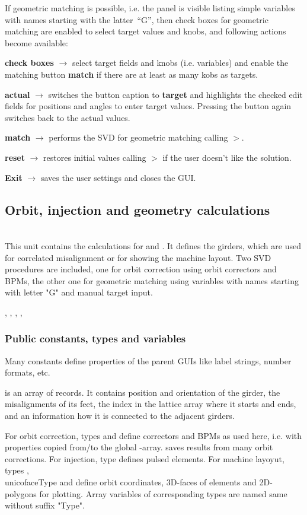 \documentclass[12pt]{article}
\newcommand\code[1]{{\tt #1}}
\newcommand{\ofld}[1]{\colorbox{black!15}{{{\color{black}\bf #1}}}}
\newcommand\guico[1]{{\color{blue}\code{#1}}}
\newcommand{\unico}[1]{{\color{burntorange}\code{#1}}}
\newcommand{\evcod}[2]{\ofld{#1} $\rightarrow$ \guico{#2}}
\newcommand{\prcod}[2]{\opauni{#1}$>$\unico{#2}}
\newcommand{\opagui}[1]{\colorbox{blue!20}{{\color{black}\code{#1}}}}
\newcommand{\ogui}[1]{\hyperref[#1]{\opagui{#1}}}
\newcommand{\opauni}[1]{\colorbox{orange!30}{{\color{black}\code{#1}}}}
\newcommand{\ounih}[2]{\subsection{\label{#2}#1}{\Huge\opauni{#2}}\\}
\newcommand{\ouni}[1]{\hyperref[#1]{\opauni{#1}}}
\newcommand{\uses}[1]{\flushleft {\bf Uses:} #1}
\newcommand{\desc}[1]{#1}
\newcommand{\pvar}[1]{\subsubsection*{Public constants, types and variables} #1}
\begin{document}
If geometric matching is possible, i.e. the panel \guico{PanMat} is visible listing simple variables with names starting with the latter~``G'', then check boxes for geometric matching are enabled to select target values and knobs, and following actions become available:

\evcod{check boxes}{chkg\_Click, chkgvar\_Click} select target fields and knobs (i.e. variables) and enable the matching button \ofld{match} if there are at least as many kobs as targets.

\evcod{actual}{butGoalClick} switches the button caption to \ofld{target} and highlights the checked edit fields for positions and angles to enter target values. Pressing the button again switches back to the actual values.

\evcod{match}{butMatClick} performs the SVD for geometric matching calling \prcod{georblib}{gmat\_ini,gmat\_step}. 

\evcod{reset}{butResetClick} restores initial values calling \prcod{georblib}{gmat\_reset}  if the user doesn't like the solution.

\evcod{Exit}{butExClick} saves the user settings and closes the GUI.





\ounih{Orbit, injection and geometry calculations}{georblib}

\desc{This unit contains the calculations for \ogui{opaorbit} and \ogui{opageometry}. It defines the girders, which are used for correlated misalignment or for showing the machine layout. Two SVD procedures are included, one for orbit correction using orbit correctors and BPMs, the other one for geometric matching using variables with names starting with letter "G" and manual target input.}

\uses{\ouni{globlib}, \ouni{linoplib}, \ouni{elemlib}, \ouni{mathlib}, \ouni{comauxlib}}

\pvar{}

Many constants define properties of the parent GUIs like label strings, number formats, etc. 

\unico{Girder} is an array of \unico{GirderType} records. It contains position and orientation of the girder, the misalignments of its feet, the index in the lattice array where it starts and ends, and an information how it is connected to the adjacent girders. 

For orbit correction, types \unico{cortype} and \unico{bpmtype} define correctors and BPMs as used here, i.e. with properties copied from/to the global \unico{Ella}-array. \unico{OrbLoopType} saves results from many orbit corrections. For injection, type \unico{kicktype} defines pulsed elements. For machine layoyut, types \unico{midpt}, \\unico{faceType} and \unico{fpolytype} define orbit coordinates, 3D-faces of elements and 2D-polygons for plotting. Array variables of corresponding types are named same without suffix "Type".
\end{document}
